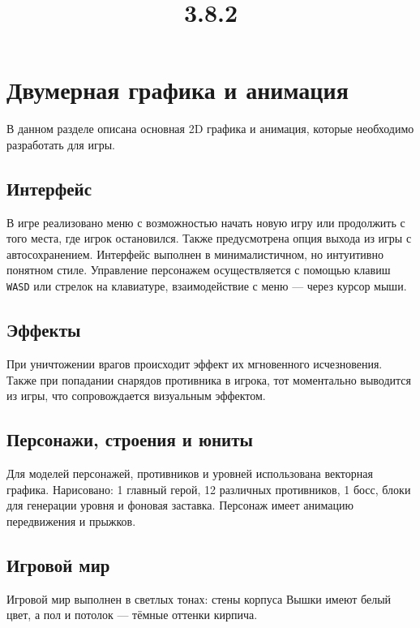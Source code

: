 \documentclass{article}
\title{3.8.2}
\author{}
\date{}
\begin{document}
\maketitle

\section{Двумерная графика и анимация}

В данном разделе описана основная 2D графика и анимация, которые необходимо разработать для игры.

\subsection{Интерфейс}
В игре реализовано меню с возможностью начать новую игру или продолжить с того места, где игрок остановился. Также предусмотрена опция выхода из игры с автосохранением. Интерфейс выполнен в минималистичном, но интуитивно понятном стиле. Управление персонажем осуществляется с помощью клавиш \texttt{WASD} или стрелок на клавиатуре, взаимодействие с меню — через курсор мыши.

\subsection{Эффекты}
При уничтожении врагов происходит эффект их мгновенного исчезновения. Также при попадании снарядов противника в игрока, тот моментально выводится из игры, что сопровождается визуальным эффектом.

\subsection{Персонажи, строения и юниты}
Для моделей персонажей, противников и уровней использована векторная графика. Нарисовано: 1 главный герой, 12 различных противников, 1 босс, блоки для генерации уровня и фоновая заставка. Персонаж имеет анимацию передвижения и прыжков.

\subsection{Игровой мир}
Игровой мир выполнен в светлых тонах: стены корпуса Вышки имеют белый цвет, а пол и потолок — тёмные оттенки кирпича.
\end{document}
